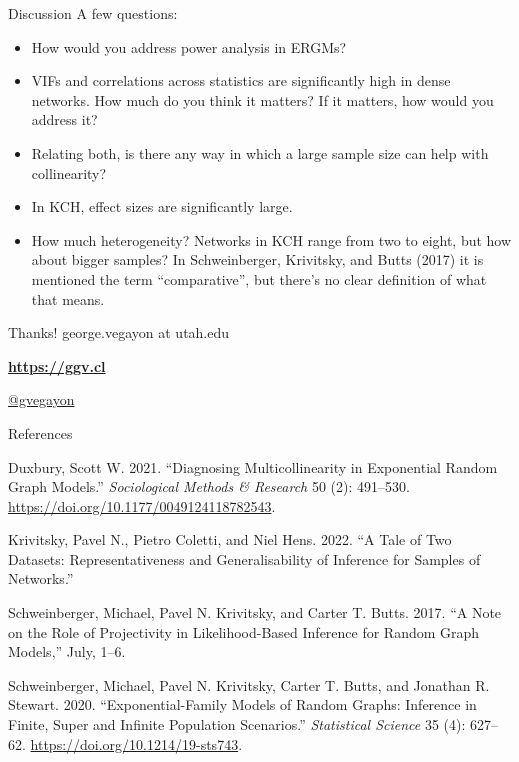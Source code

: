 \documentclass[
  ignorenonframetext,
  aspectratio=169,
]{beamer}
\newlength{\cslhangindent}
\newlength{\cslentryspacingunit} %
\newenvironment{CSLReferences}[2] %
 {%
  \setlength{\parindent}{0pt}
  \ifodd #1
  \let\oldpar\par
  \def\par{\hangindent=\cslhangindent\oldpar}
  \fi
  \setlength{\parskip}{#2\cslentryspacingunit}
 }%
 {}
\begin{document}
\begin{frame}{Discussion}
\protect\hypertarget{discussion}{}
A few questions:

\begin{itemize}
\item
  How would you address power analysis in ERGMs?
\item
  VIFs and correlations across statistics are significantly high in
  dense networks. How much do you think it matters? If it matters, how
  would you address it?
\item
  Relating both, is there any way in which a large sample size can help
  with collinearity?
\item
  In KCH, effect sizes are significantly large.
\item
  How much heterogeneity? Networks in KCH range from two to eight, but
  how about bigger samples? In Schweinberger, Krivitsky, and Butts
  (2017) it is mentioned the term ``comparative'', but there's no clear
  definition of what that means.
\end{itemize}
\end{frame}

\begin{frame}
\begin{block}{Thanks!}
\protect\hypertarget{thanks}{}
george.vegayon at utah.edu

\href{https://ggvy.cl}{\textbf{https://ggv.cl}}

\href{https://twitter.com/gvegayon}{ @gvegayon}
\end{block}
\end{frame}

\begin{frame}{References}
\protect\hypertarget{references}{}
\hypertarget{refs}{}
\begin{CSLReferences}{1}{0}
\leavevmode{}%
Duxbury, Scott W. 2021. {``Diagnosing {Multicollinearity} in
{Exponential Random Graph Models}.''} \emph{Sociological Methods \&
Research} 50 (2): 491--530.
\url{https://doi.org/10.1177/0049124118782543}.

\leavevmode{}%
Krivitsky, Pavel N., Pietro Coletti, and Niel Hens. 2022. {``A {Tale} of
{Two Datasets}: {Representativeness} and {Generalisability} of
{Inference} for {Samples} of {Networks}.''}

\leavevmode{}%
Schweinberger, Michael, Pavel N. Krivitsky, and Carter T. Butts. 2017.
{``A Note on the Role of Projectivity in Likelihood-Based Inference for
Random Graph Models,''} July, 1--6.

\leavevmode{}%
Schweinberger, Michael, Pavel N. Krivitsky, Carter T. Butts, and
Jonathan R. Stewart. 2020. {``Exponential-{Family Models} of {Random
Graphs}: {Inference} in {Finite}, {Super} and {Infinite Population
Scenarios}.''} \emph{Statistical Science} 35 (4): 627--62.
\url{https://doi.org/10.1214/19-sts743}.

\end{CSLReferences}
\end{frame}
\end{document}
